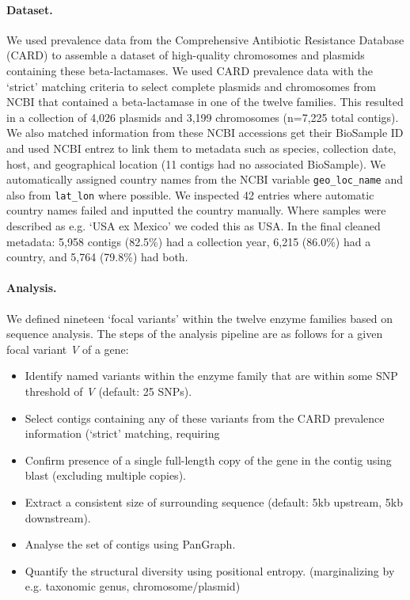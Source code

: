 \documentclass[aps,rmp,preprint,superscriptaddress,10pt,twocolumn]{revtex4-1}
\begin{document}
\paragraph*{Dataset.} We used prevalence data from the Comprehensive Antibiotic Resistance Database (CARD) \cite{Alcock2023} to assemble a dataset of high-quality chromosomes and plasmids containing these beta-lactamases. We used CARD prevalence data with the `strict' matching criteria to select complete plasmids and chromosomes from NCBI that contained a beta-lactamase in one of the twelve families. This resulted in a collection of 4,026 plasmids and 3,199 chromosomes (n=7,225 total contigs). We also matched information from these NCBI accessions get their BioSample ID and used NCBI entrez to link them to metadata such as species, collection date, host, and geographical location (11 contigs had no associated BioSample). We automatically assigned country names from the NCBI variable \texttt{geo\_loc\_name} and also from \texttt{lat\_lon} where possible. We inspected 42 entries where automatic country names failed and inputted the country manually. Where samples were described as e.g. `USA ex Mexico' we coded this as USA. In the final cleaned metadata: 5,958 contigs (82.5\%) had a collection year, 6,215 (86.0\%) had a country, and 5,764 (79.8\%) had both. \par


\paragraph*{Analysis.} We defined nineteen `focal variants' within the twelve enzyme families based on sequence analysis. The steps of the analysis pipeline are as follows for a given focal variant \textit{V} of a gene:

\begin{itemize}
    \item Identify named variants within the enzyme family that are within some SNP threshold of \textit{V} (default: 25 SNPs). 
    \item Select contigs containing any of these variants from the CARD prevalence information (`strict' matching, requiring 
    \item Confirm presence of a single full-length copy of the gene in the contig using blast (excluding multiple copies).
    \item Extract a consistent size of surrounding sequence (default: 5kb upstream, 5kb downstream). 
    \item Analyse the set of contigs using PanGraph.
    \item Quantify the structural diversity using positional entropy. (marginalizing by e.g. taxonomic genus, chromosome/plasmid)
\end{itemize}
\end{document}
